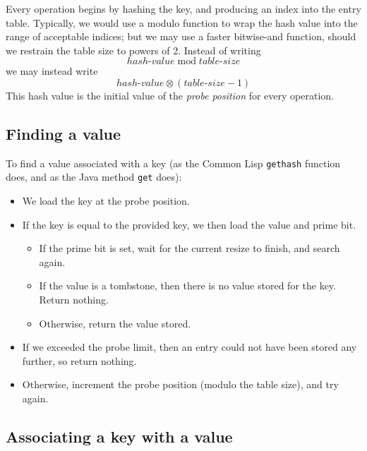 \documentclass{article}
\begin{document}
Every operation begins by hashing the key, and producing an index into
the entry table. Typically, we would use a modulo function to wrap the
hash value into the range of acceptable indices; but we may use a
faster bitwise-and function, should we restrain the table size to
powers of 2. Instead of writing
$$ hash\text{-}value \;\mathrm{mod}\; table\text{-}size $$
we may instead write
$$ hash\text{-}value \otimes (table\text{-}size - 1) $$
This hash value is the initial value of the \emph{probe position} for
every operation.

\subsection{Finding a value}

To find a value associated with a key (as the Common Lisp
\texttt{gethash} function does, and as the Java method \texttt{get}
does):
\begin{itemize}
\item We load the key at the probe position.
\item If the key is equal to the provided key, we then load the value
  and prime bit.
  \begin{itemize}
  \item If the prime bit is set, wait for the current resize to
    finish, and search again.
  \item If the value is a tombstone, then there is no value stored for
    the key. Return nothing.
  \item Otherwise, return the value stored.
  \end{itemize}
\item If we exceeded the probe limit, then an entry could not have
  been stored any further, so return nothing.
\item Otherwise, increment the probe position (modulo the table size),
  and try again.
\end{itemize}

\subsection{Associating a key with a value}
\end{document}
